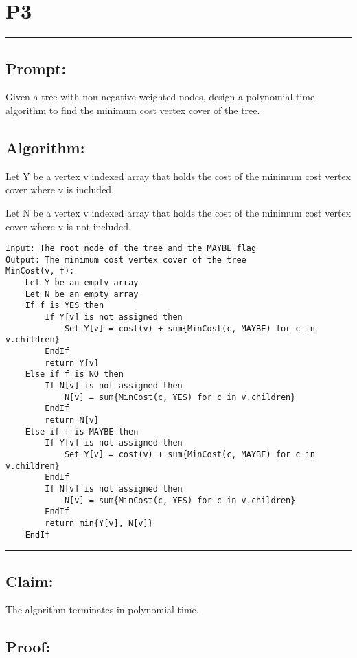 \documentclass[11pt]{article}
\title{}
\author{}
\date{}
\begin{document}
\section*{P3}

\noindent\textcolor[RGB]{220,220,220}{\rule{\linewidth}{0.8pt}}

\subsection*{Prompt:} 

Given a tree with non-negative weighted nodes, design a polynomial time algorithm to find the minimum cost vertex cover of the tree. 

\subsection*{Algorithm:}
Let Y be a vertex v indexed array that holds the cost of the minimum cost vertex cover where v is included. 

Let N be a vertex v indexed array that holds the cost of the minimum cost vertex cover where v is not included.

\begin{lstlisting}[basicstyle=\small, mathescape=true]
Input: The root node of the tree and the MAYBE flag
Output: The minimum cost vertex cover of the tree
MinCost(v, f):
	Let Y be an empty array
	Let N be an empty array
	If f is YES then
		If Y[v] is not assigned then
			Set Y[v] = cost(v) + sum{MinCost(c, MAYBE) for c in v.children}
		EndIf
		return Y[v]
	Else if f is NO then
		If N[v] is not assigned then
			N[v] = sum{MinCost(c, YES) for c in v.children}
		EndIf
		return N[v]
	Else if f is MAYBE then
		If Y[v] is not assigned then
			Set Y[v] = cost(v) + sum{MinCost(c, MAYBE) for c in v.children}
		EndIf
		If N[v] is not assigned then
			N[v] = sum{MinCost(c, YES) for c in v.children}
		EndIf
		return min{Y[v], N[v]}
	EndIf
\end{lstlisting}

\noindent\textcolor[RGB]{220,220,220}{\rule{\linewidth}{0.8pt}}
\linebreak

\subsection*{Claim:} 

The algorithm terminates in polynomial time.

\subsection*{Proof:}
\end{document}
